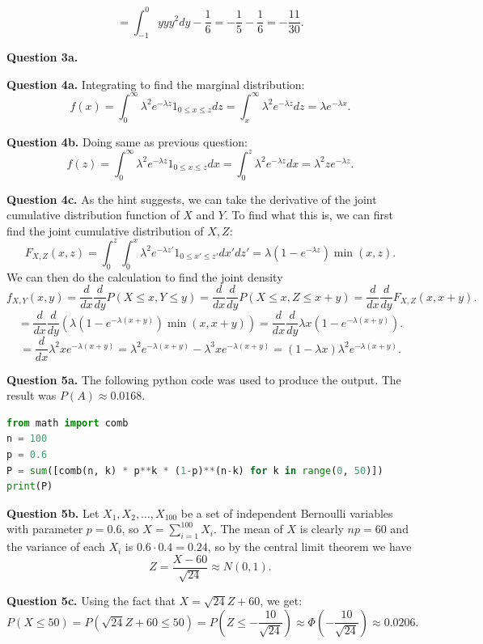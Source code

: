 \documentclass[letterpaper, reqno,11pt]{article}
\begin{document}
\[
    =\int_{-1}^{0}y y y^2dy-\frac{1}{6}=-\frac{1}{5}-\frac{1}{6}=-\frac{11}{30}
.\]

{\medskip\noindent\bf Question 3a.} 

{\medskip\noindent\bf Question 4a.} Integrating to find the marginal distribution:
\[
f(x)=\int_0^{\infty}\lambda^2e^{-\lambda z}1_{0\leq x\leq z}dz=\int_x^{\infty}\lambda^2e^{-\lambda z}dz=\lambda e^{-\lambda x}
.\]

{\medskip\noindent\bf Question 4b.} Doing same as previous question: 
\[
f(z)=\int_0^{\infty}\lambda^2e^{-\lambda z}1_{0\leq x\leq z}dx=\int_0^{z}\lambda^2e^{-\lambda z}dx=\lambda^2z e^{-\lambda z}
.\]

{\medskip\noindent\bf Question 4c.} As the hint suggests, we can take the derivative of the joint cumulative distribution function of $X$ and $Y$. To find what this is, we can first find the joint cumulative distribution of $X,Z$: 
\[
F_{X,Z}(x,z)=\int_0^{z}\int_0^{x}\lambda^2e^{-\lambda z'}1_{0\leq x'\leq z'}dx'dz'=\lambda \left(1-e^{-\lambda z}\right)\min(x,z)
.\]
We can then do the calculation to find the joint density
\[
f_{X,Y}(x,y)=\frac{d}{dx}\frac{d}{dy}P(X\leq x,Y\leq y)=\frac{d}{dx}\frac{d}{dy}P(X\leq x, Z\leq x+y)=\frac{d}{dx}\frac{d}{dy}F_{X,Z}(x,x+y)
.\]
\[
=\frac{d}{dx}\frac{d}{dy}\left( \lambda\left( 1-e^{-\lambda(x+y)} \right) \min(x,x+y) \right) =\frac{d}{dx}\frac{d}{dy}\lambda x\left( 1-e^{-\lambda(x+y)} \right)
.\]
\[
=\frac{d}{dx}\lambda^2 xe^{-\lambda(x+y)}=\lambda^2e^{-\lambda(x+y)}-\lambda^3x e^{-\lambda(x+y)}=\left( 1-\lambda x \right) \lambda ^2e^{-\lambda(x+y)}
.\]

{\medskip\noindent\bf Question 5a.} The following python code was used to produce the output. The result was $P(A)\approx 0.0168$. 

\begin{lstlisting}[language=Python]
from math import comb
n = 100
p = 0.6
P = sum([comb(n, k) * p**k * (1-p)**(n-k) for k in range(0, 50)])
print(P)
\end{lstlisting}

{\medskip\noindent\bf Question 5b.} Let $X_1, X_2,\ldots, X_{100}$ be a set of independent Bernoulli variables with parameter $p=0.6$, so $X=\sum_{i=1}^{100}X_i$. The mean of $X$ is clearly $np=60$ and the variance of each $X_i$ is $0.6\cdot 0.4=0.24$, so by the central limit theorem we have 
\[
Z=\frac{X-60}{\sqrt{24} }\approx N(0,1)
.\]

{\medskip\noindent\bf Question 5c.} Using the fact that $X=\sqrt{24} Z+60$, we get: 
\[
P(X\leq 50)= P(\sqrt{24} Z+60\leq 50)=P(Z\leq -\frac{10}{\sqrt{24} })\approx \Phi(-\frac{10}{\sqrt{24} })\approx 0.0206
.\]
\end{document}
